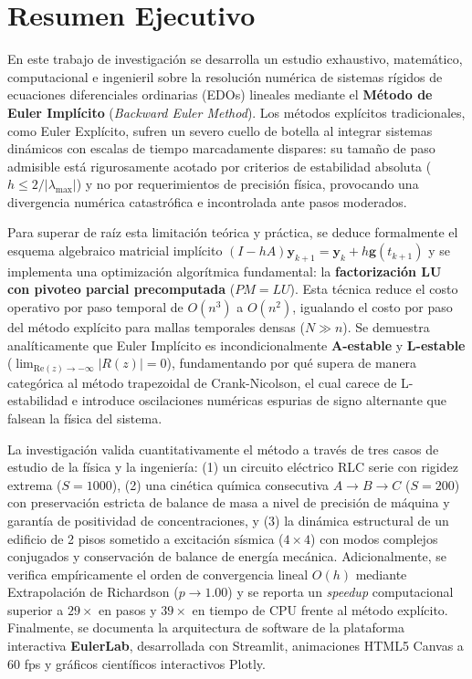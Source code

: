 \documentclass[11pt,a4paper]{article}
\begin{document}
\section*{Resumen Ejecutivo}

En este trabajo de investigación se desarrolla un estudio exhaustivo, matemático, computacional e ingenieril sobre la resolución numérica de sistemas rígidos de ecuaciones diferenciales ordinarias (EDOs) lineales mediante el \textbf{Método de Euler Implícito} (\textit{Backward Euler Method}). Los métodos explícitos tradicionales, como Euler Explícito, sufren un severo cuello de botella al integrar sistemas dinámicos con escalas de tiempo marcadamente dispares: su tamaño de paso admisible está rigurosamente acotado por criterios de estabilidad absoluta ($h \le 2/|\lambda_{\max}|$) y no por requerimientos de precisión física, provocando una divergencia numérica catastrófica e incontrolada ante pasos moderados.

Para superar de raíz esta limitación teórica y práctica, se deduce formalmente el esquema algebraico matricial implícito $(I - hA)\mathbf{y}_{k+1} = \mathbf{y}_k + h\mathbf{g}(t_{k+1})$ y se implementa una optimización algorítmica fundamental: la \textbf{factorización LU con pivoteo parcial precomputada} ($PM = LU$). Esta técnica reduce el costo operativo por paso temporal de $O(n^3)$ a $O(n^2)$, igualando el costo por paso del método explícito para mallas temporales densas ($N \gg n$). Se demuestra analíticamente que Euler Implícito es incondicionalmente \textbf{A-estable} y \textbf{L-estable} ($\lim_{\text{Re}(z) \to -\infty} |R(z)| = 0$), fundamentando por qué supera de manera categórica al método trapezoidal de Crank-Nicolson, el cual carece de L-estabilidad e introduce oscilaciones numéricas espurias de signo alternante que falsean la física del sistema.

La investigación valida cuantitativamente el método a través de tres casos de estudio de la física y la ingeniería: (1) un circuito eléctrico RLC serie con rigidez extrema ($S = 1000$), (2) una cinética química consecutiva $A \to B \to C$ ($S = 200$) con preservación estricta de balance de masa a nivel de precisión de máquina y garantía de positividad de concentraciones, y (3) la dinámica estructural de un edificio de 2 pisos sometido a excitación sísmica ($4 \times 4$) con modos complejos conjugados y conservación de balance de energía mecánica. Adicionalmente, se verifica empíricamente el orden de convergencia lineal $O(h)$ mediante Extrapolación de Richardson ($p \to 1.00$) y se reporta un \textit{speedup} computacional superior a $29\times$ en pasos y $39\times$ en tiempo de CPU frente al método explícito. Finalmente, se documenta la arquitectura de software de la plataforma interactiva \textbf{EulerLab}, desarrollada con Streamlit, animaciones HTML5 Canvas a 60 fps y gráficos científicos interactivos Plotly.
\end{document}
